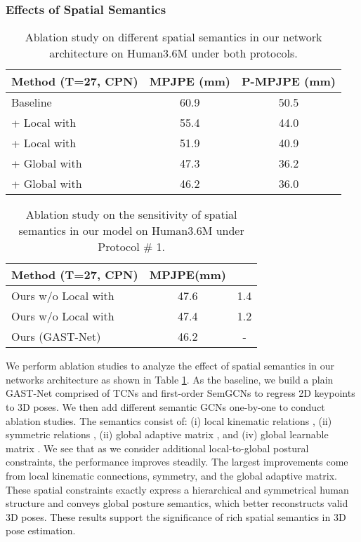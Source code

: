 \documentclass[letterpaper, 10 pt, conference, twoside]{ieeeconf}
\begin{document}
\subsubsection{Effects of Spatial Semantics}
\begin{table}[tbp]
	\caption{Ablation study on different spatial semantics in our network architecture on Human3.6M under both protocols.}
	\label{table:1}
	\begin{center}
		\begin{tabular}{l|cc}
			\toprule[1pt]
Method (T=27, CPN)                       & MPJPE (mm) & P-MPJPE (mm)   
			\\ \midrule[0.5pt]
			Baseline                                 & 60.9      & 50.5          \\
			+ Local  with  & 55.4      & 44.0          \\
			+ Local  with  & 51.9      & 40.9          \\
			+ Global   with          & 47.3      & 36.2          \\
			+ Global   with          & 46.2      & 36.0         \\ \bottomrule[1pt]
		\end{tabular}
	\end{center}
\end{table}
\begin{table}[tbp]
	\caption{Ablation study on the sensitivity of spatial semantics in our model on Human3.6M under Protocol \# 1.}
	\label{table:2}
	\begin{center}
		\begin{tabular}{l|c|c}
			\toprule[1pt]
Method (T=27, CPN)                                & MPJPE(mm) &    
			\\ \midrule[0.5pt]
			Ours w/o Local  with  & 47.6      & 1.4        \\
			Ours w/o Local  with  & 47.4      & 1.2        \\ 
			\midrule[0.5pt]
			Ours (GAST-Net)                                   & 46.2      & -          
			\\ 
			\bottomrule[1pt]
		\end{tabular}
	\end{center}
\end{table}
We perform ablation studies to analyze the effect of spatial semantics in our networks architecture as shown in Table \ref{table:1}. As the baseline, we build a plain GAST-Net comprised of TCNs and first-order SemGCNs to regress 2D keypoints to 3D poses. We then add different semantic GCNs one-by-one to conduct ablation studies. The semantics consist of: 
(i) local kinematic relations , 
(ii) symmetric relations , 
(ii) global adaptive matrix ,  and 
(iv) global learnable matrix . 
We see that as we consider additional local-to-global postural constraints, the performance improves steadily. The largest improvements come from local kinematic connections, symmetry, and the global adaptive matrix. These spatial constraints exactly express a hierarchical and symmetrical human structure and conveys global posture semantics, which better reconstructs valid 3D poses. These results support the significance of rich spatial semantics in 3D pose estimation.
\end{document}
